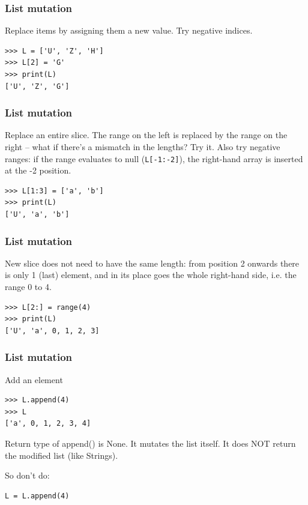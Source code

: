\begin{frame}[fragile]\frametitle{List mutation}
Replace items by assigning them
  a new value. Try negative indices.
\begin{lstlisting}
>>> L = ['U', 'Z', 'H']
>>> L[2] = 'G'
>>> print(L)
['U', 'Z', 'G']
\end{lstlisting}
\end{frame}

\begin{frame}[fragile]\frametitle{List mutation}

Replace an entire slice. The range on the left is replaced by the range on the right -- what if there's a mismatch in the lengths? Try it. Also try negative ranges: if the range evaluates to null (\texttt{L[-1:-2]}), the right-hand array is inserted at the -2 position.
\begin{lstlisting}
>>> L[1:3] = ['a', 'b']
>>> print(L)
['U', 'a', 'b']
\end{lstlisting}
\end{frame}


\begin{frame}[fragile]\frametitle{List mutation}
New slice does not need to have the same length: from position 2 onwards there is only 1 (last) element, and in its place goes the whole right-hand side, i.e. the range 0 to 4.
\begin{lstlisting}
>>> L[2:] = range(4)
>>> print(L)
['U', 'a', 0, 1, 2, 3]
\end{lstlisting}
\end{frame}

\begin{frame}[fragile]\frametitle{List mutation}
Add an element
\begin{lstlisting}
>>> L.append(4)
>>> L
['a', 0, 1, 2, 3, 4]
\end{lstlisting}
Return type of append() is None. It mutates the list itself. It does NOT return the modified list (like Strings).

So don't do:

\begin{lstlisting}
L = L.append(4)
\end{lstlisting}

\end{frame}

